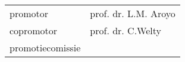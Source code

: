 \thispagestyle{empty}

\begin{addmargin}[-3cm]{1cm}

\begin{flushleft}
\begin{tabular}{l l}
promotor&prof. dr. L.M. Aroyo\\
copromotor&prof. dr. C.Welty\\
promotiecomissie&\\
\end{tabular}
\end{flushleft}

\end{addmargin}